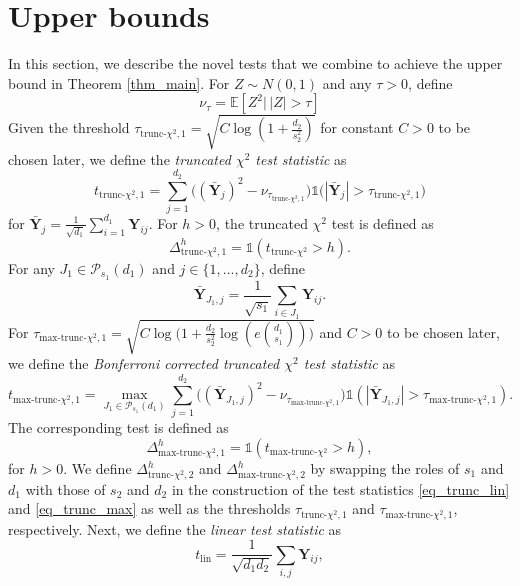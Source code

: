 \documentclass{article}
\newcommand{\Y}{\mathbf{Y}}
\newcommand{\bbP}{\mathbb{P}}
\newcommand{\EE}{\mathbb{E}}
\newcommand{\one}{\mathds{1}}
\newcommand{\lin}{\text{lin}}
\newcommand{\chisqlin}{\text{trunc-$\chi^2$}}
\newcommand{\chisqmax}{\text{max-trunc-$\chi^2$}}
\theoremstyle{remark}
\begin{document}
\section{Upper bounds}\label{sec_ub}
In this section, we describe the novel tests that we combine to achieve the upper bound in Theorem \ref{thm_main}. For $Z \sim N(0,1)$ and any $\tau>0$, define 
\begin{equation}\label{eq:betatau}
    \nu_{\tau} = \EE[Z^2 \big|\, |Z|>\tau]  %
\end{equation}
Given the threshold $\tau_{\chisqlin, 1} = \sqrt{C\log(1 + \frac{d_2}{s_2^2})}$ for constant $C > 0$ to be chosen later, we define the \textit{truncated $\chi^2$ test statistic} as
\begin{equation}\label{eq_trunc_lin}
    t_{\chisqlin, 1} = \sum_{j = 1}^{d_2}\Big((\bar{\Y}_j)^2 - \nu_{\tau_{\chisqlin, 1}}\Big)\one\big(|\bar{\Y}_j| > \tau_{\chisqlin, 1}\big)
\end{equation}
for $\bar{\Y}_j = \frac{1}{\sqrt{d_1}}\sum_{i = 1}^{d_1}\Y_{ij}$. For $h > 0$, the truncated $\chi^2$ test is defined as 
\begin{equation}
\Delta_{\chisqlin, 1}^h = \one(t_{\chisqlin} > h).
\end{equation}
For any $J_1 \in \mathcal{P}_{s_1}(d_1)$ and $j \in \{1, ..., d_2\}$, define 
\[\bar{\Y}_{J_1, j} = \frac{1}{\sqrt{s_1}}\sum_{i \in J_1}\Y_{ij}.\]
For $\tau_{\chisqmax, 1} = \sqrt{C\log\Big(1 + \frac{d_2}{s_2^2}\log (e{d_1 \choose s_1})\Big)}$ and $C > 0$ to be chosen later, we define the \textit{Bonferroni corrected truncated $\chi^2$ test statistic} as
\begin{equation}\label{eq_trunc_max}
    t_{\chisqmax, 1} = \max_{J_1 \in \mathcal P_{s_1}\!(d_1)}\sum_{j = 1}^{d_2}\big((\bar{\Y}_{J_1, j})^2 - \nu_{\tau_{\chisqmax, 1}}\big)\one(|\bar{\Y}_{J_1, j}| > \tau_{\chisqmax, 1}).
\end{equation}
The corresponding test is defined as 
\begin{equation}
\Delta_{\chisqmax, 1}^h = \one(t_{\chisqmax} > h),
\end{equation}
for $h > 0$. We define $\Delta_{\chisqlin, 2}^h$ and $\Delta_{\chisqmax, 2}^h$ by swapping the roles of $s_1$ and $d_1$ with those of $s_2$ and $d_2$ in the construction of the test statistics \eqref{eq_trunc_lin} and \eqref{eq_trunc_max} as well as the thresholds $\tau_{\chisqlin, 1}$ and $\tau_{\chisqmax, 1}$, respectively. Next, we define the \textit{linear test statistic} as
\begin{equation}
    t_{\lin} = \frac{1}{\sqrt{d_1d_2}}\sum_{i, j}\Y_{ij},
\end{equation}
\end{document}
